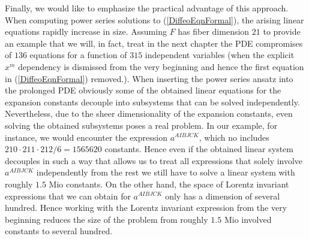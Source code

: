 Finally, we would like to emphasize the practical advantage of this approach. When computing power series solutions to (\ref{DiffeoEqnFormal}), the arising linear equations rapidly increase in size. Assuming $F$ has fiber dimension $21$ to provide an example that we will, in fact, treat in the next chapter the PDE compromises of $136$ equations for a function of $315$ independent variables (when the explicit $x^m$ dependency is dismissed from the very beginning and hence the first equation in (\ref{DiffeoEqnFormal}) removed.).  When inserting the power series ansatz into the prolonged PDE obviously some of the obtained linear equations for the expansion constants decouple into subsystems that can be solved independently. Nevertheless, due to the sheer dimensionality of the expansion constants, even solving the obtained subsystems poses a real problem. In our example, for instance, we would encounter the expression $a^{AIBJCK}$, which no includes $210\cdot 211\cdot212/6=1565620$ constants. Hence even if the obtained linear system decouples in such a way that allows us to treat all expressions that solely involve $a^{AIBJCK}$ independently from the rest we still have to solve a linear system with roughly $1.5$ Mio constants. On the other hand, the space of Lorentz invariant expressions that we can obtain for $a^{AIBJCK}$ only has a dimension of several hundred. Hence working with the Lorentz invariant expression from the very beginning reduces the size of the problem from roughly $1.5$ Mio involved constants to several hundred. 

